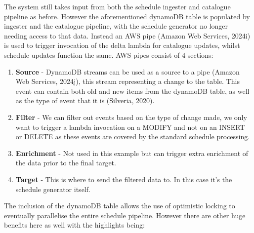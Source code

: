   The system still takes input from both the schedule ingester and catalogue pipeline as before. However the aforementioned dynamoDB table is populated 
  by ingester and the catalogue pipeline, with the schedule generator no longer needing access to that data. Instead an AWS pipe (Amazon Web Services, 2024i) 
  is used to trigger invocation of the delta lambda for catalogue updates, whilst schedule updates function the same. AWS pipes consist of 4 sections:

  \begin{enumerate}
    \item \textbf{Source} - DynamoDB streams can be used as a source to a pipe (Amazon Web Services, 2024j), this stream representing a change to the table.
    This event can contain both old and new items from the dynamoDB table, as well as the type of event that it is (Silveria, 2020).
    \item \textbf{Filter} - We can filter out events based on the type of change made, we only want to trigger a lambda invocation on a MODIFY and not 
    on an INSERT or DELETE as these events are covered by the standard schedule processing.
    \item \textbf{Enrichment} - Not used in this example but can trigger extra enrichment of the data prior to the final target.
    \item \textbf{Target} - This is where to send the filtered data to. In this case it's the schedule generator itself.
  \end{enumerate}

  The inclusion of the dynamoDB table allows the use of optimistic locking to eventually parallelise the entire schedule pipeline. However there are 
  other huge benefits here as well with the highlights being:

